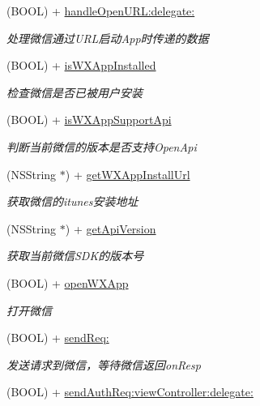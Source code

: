 \begin{DoxyCompactItemize}
(B\+O\+OL) + \mbox{\hyperlink{interface_w_x_api_aab36d7c09414d7bc3d7ca200b48f2f9c}{handle\+Open\+U\+R\+L\+:delegate\+:}}
\begin{DoxyCompactList}\small\item\em 处理微信通过\+U\+R\+L启动\+App时传递的数据 \end{DoxyCompactList}\item 
(B\+O\+OL) + \mbox{\hyperlink{interface_w_x_api_a3684676bea249fdd0708a38ee74f0604}{is\+W\+X\+App\+Installed}}
\begin{DoxyCompactList}\small\item\em 检查微信是否已被用户安装 \end{DoxyCompactList}\item 
(B\+O\+OL) + \mbox{\hyperlink{interface_w_x_api_a1ae34dd86ae2c2f553dd6981a35397ee}{is\+W\+X\+App\+Support\+Api}}
\begin{DoxyCompactList}\small\item\em 判断当前微信的版本是否支持\+Open\+Api \end{DoxyCompactList}\item 
(N\+S\+String $\ast$) + \mbox{\hyperlink{interface_w_x_api_a5e8a0217bef24a40c7d2edd9b3c5cdb9}{get\+W\+X\+App\+Install\+Url}}
\begin{DoxyCompactList}\small\item\em 获取微信的itunes安装地址 \end{DoxyCompactList}\item 
(N\+S\+String $\ast$) + \mbox{\hyperlink{interface_w_x_api_a5995d42d92822722f7ebf11663db2d33}{get\+Api\+Version}}
\begin{DoxyCompactList}\small\item\em 获取当前微信\+S\+D\+K的版本号 \end{DoxyCompactList}\item 
(B\+O\+OL) + \mbox{\hyperlink{interface_w_x_api_ac238ad8f1aa670ea9b26836f77701dc2}{open\+W\+X\+App}}
\begin{DoxyCompactList}\small\item\em 打开微信 \end{DoxyCompactList}\item 
(B\+O\+OL) + \mbox{\hyperlink{interface_w_x_api_a1a30bc4f39815920b6e45901375bee8e}{send\+Req\+:}}
\begin{DoxyCompactList}\small\item\em 发送请求到微信，等待微信返回on\+Resp \end{DoxyCompactList}\item 
(B\+O\+OL) + \mbox{\hyperlink{interface_w_x_api_a646e42926ec7378a087674e54150b2c9}{send\+Auth\+Req\+:view\+Controller\+:delegate\+:}}

\end{DoxyCompactItemize}
